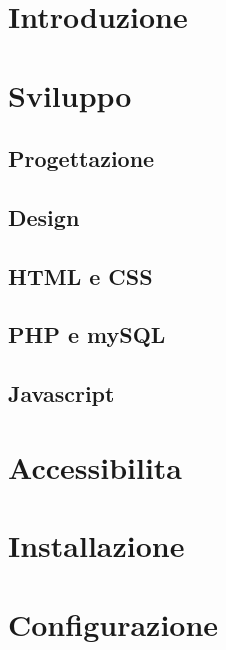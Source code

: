 \documentclass{article}
\begin{document}
\tableofcontents

\newpage

\section{Introduzione}



\section{Sviluppo}
\subsection{Progettazione}


\subsection{Design}



\subsection{HTML e CSS}



\subsection{PHP e mySQL}



\subsection{Javascript}


\section{Accessibilita}



\section{Installazione}


\section{Configurazione}

\end{document}
